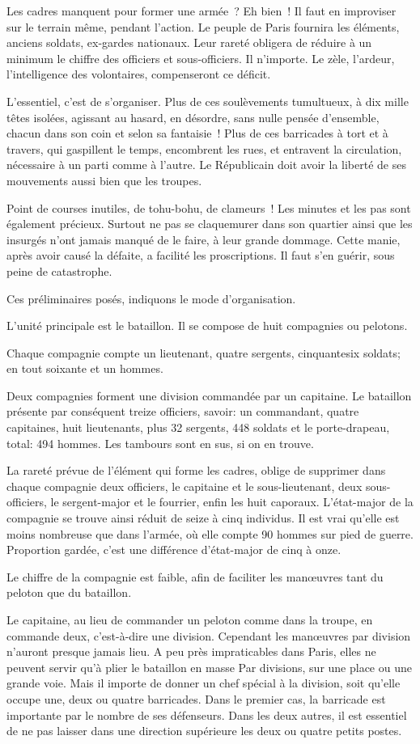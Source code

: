 \documentclass[french,twoside]{book} %
\newcommand\chapterclose{} %
\begin{document}
Les cadres manquent pour former une armée ? Eh bien ! Il faut en improviser sur le terrain même, pendant l’action. Le peuple de Paris fournira les éléments, anciens soldats, ex-gardes nationaux. Leur rareté obligera de réduire à un minimum le chiffre des officiers et sous-officiers. Il n’importe. Le zèle, l’ardeur, l’intelligence des volontaires, compenseront ce déficit.\par
L'essentiel, c’est de s’organiser. Plus de ces soulèvements tumultueux, à dix mille têtes isolées, agissant au hasard, en désordre, sans nulle pensée d’ensemble, chacun dans son coin et selon sa fantaisie ! Plus de ces barricades à tort et à travers, qui gaspillent le temps, encombrent les rues, et entravent la circulation, nécessaire à un parti comme à l’autre. Le Républicain doit avoir la liberté de ses mouvements aussi bien que les troupes.\par
Point de courses inutiles, de tohu-bohu, de clameurs ! Les minutes et les pas sont également précieux. Surtout ne pas se claquemurer dans son quartier ainsi que les insurgés n’ont jamais manqué de le faire, à leur grande dommage. Cette manie, après avoir causé la défaite, a facilité les proscriptions. Il faut s’en guérir, sous peine de catastrophe.\par
Ces préliminaires posés, indiquons le mode d’organisation.\par
L'unité principale est le bataillon. Il se compose de huit compagnies ou pelotons.\par
Chaque compagnie compte un lieutenant, quatre sergents, cinquantesix soldats; en tout soixante et un hommes.\par
Deux compagnies forment une division commandée par un capitaine. Le bataillon présente par conséquent treize officiers, savoir: un commandant, quatre capitaines, huit lieutenants, plus 32 sergents, 448 soldats et le porte-drapeau, total: 494 hommes. Les tambours sont en sus, si on en trouve.\par
La rareté prévue de l’élément qui forme les cadres, oblige de supprimer dans chaque compagnie deux officiers, le capitaine et le sous-lieutenant, deux sous-officiers, le sergent-major et le fourrier, enfin les huit caporaux. L'état-major de la compagnie se trouve ainsi réduit de seize à cinq individus. Il est vrai qu’elle est moins nombreuse que dans l’armée, où elle compte 90 hommes sur pied de guerre. Proportion gardée, c’est une différence d’état-major de cinq à onze.\par
Le chiffre de la compagnie est faible, afin de faciliter les manœuvres tant du peloton que du bataillon.\par
Le capitaine, au lieu de commander un peloton comme dans la troupe, en commande deux, c’est-à-dire une division. Cependant les manœuvres par division n’auront presque jamais lieu. A peu près impraticables dans Paris, elles ne peuvent servir qu’à plier le bataillon en masse Par divisions, sur une place ou une grande voie. Mais il importe de donner un chef spécial à la division, soit qu’elle occupe une, deux ou quatre barricades. Dans le premier cas, la barricade est importante par le nombre de ses défenseurs. Dans les deux autres, il est essentiel de ne pas laisser dans une direction supérieure les deux ou quatre petits postes.
\chapterclose
\end{document}
